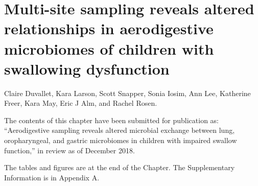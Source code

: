 
\graphicspath{{aspiration/figures/}}

\chapter{Multi-site sampling reveals altered relationships in aerodigestive microbiomes of children with swallowing dysfunction}\label{chap:aspiration}

Claire Duvallet, Kara Larson, Scott Snapper, Sonia Iosim, Ann Lee, Katherine Freer, Kara May, Eric J Alm, and Rachel Rosen.

\bigskip
\bigskip
\noindent
The contents of this chapter have been submitted for publication as: ``Aerodigestive sampling reveals altered microbial exchange between lung, oropharyngeal, and gastric microbiomes in children with impaired swallow function,'' in review as of December 2018.

\bigskip
\bigskip
\noindent
The tables and figures are at the end of the Chapter. The Supplementary Information is in Appendix A.

\clearpage

